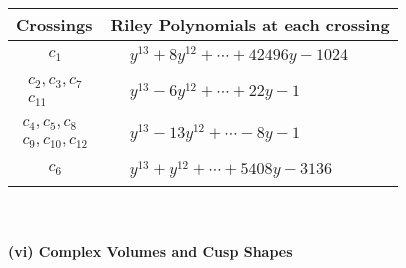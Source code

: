 \documentclass[1p]{elsarticle_modified}
\theoremstyle{definition}
\begin{document}
\begin{tabular}{m{50pt}|m{274pt}}
Crossings & \hspace{64pt}Riley Polynomials at each crossing \\
\hline $$\begin{aligned}c_{1}\end{aligned}$$&$\begin{aligned}
&y^{13}+8 y^{12}+\cdots+42496 y-1024
\end{aligned}$\\
\hline $$\begin{aligned}c_{2},c_{3},c_{7}\\c_{11}\end{aligned}$$&$\begin{aligned}
&y^{13}-6 y^{12}+\cdots+22 y-1
\end{aligned}$\\
\hline $$\begin{aligned}c_{4},c_{5},c_{8}\\c_{9},c_{10},c_{12}\end{aligned}$$&$\begin{aligned}
&y^{13}-13 y^{12}+\cdots-8 y-1
\end{aligned}$\\
\hline $$\begin{aligned}c_{6}\end{aligned}$$&$\begin{aligned}
&y^{13}+y^{12}+\cdots+5408 y-3136
\end{aligned}$\\
\hline
\end{tabular}\\~\\
\newpage\flushleft \textbf{(vi) Complex Volumes and Cusp Shapes}
\end{document}
